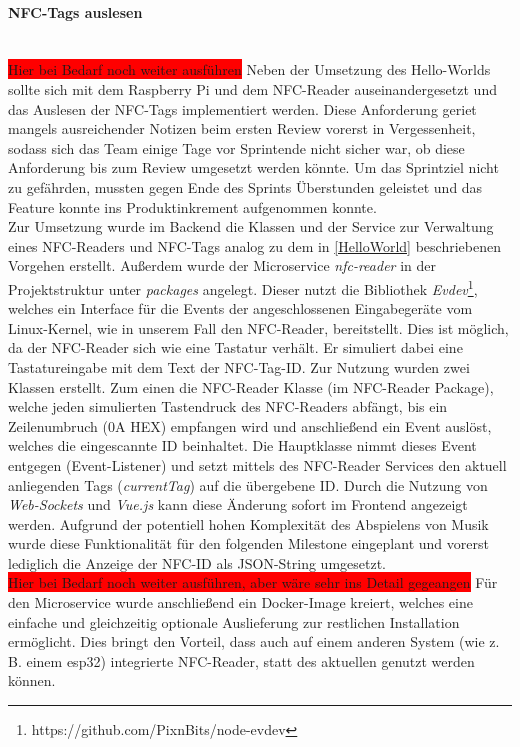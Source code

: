 \documentclass[10pt, a4paper]{article}
\begin{document}
\begin{onehalfspace}
\paragraph*{NFC-Tags auslesen} $~$ \\
\colorbox{red}{Hier bei Bedarf noch weiter ausführen}
Neben der Umsetzung des Hello-Worlds sollte sich mit dem Raspberry Pi und dem NFC-Reader auseinandergesetzt und das Auslesen der NFC-Tags implementiert werden. Diese Anforderung geriet mangels ausreichender Notizen beim ersten Review vorerst
in Vergessenheit, sodass sich das Team einige Tage vor Sprintende nicht sicher war, ob diese Anforderung bis zum Review umgesetzt werden könnte.
Um das Sprintziel nicht zu gefährden, mussten gegen Ende des Sprints Überstunden geleistet und das Feature konnte ins Produktinkrement aufgenommen konnte.
\\
Zur Umsetzung wurde im Backend die Klassen und der Service zur Verwaltung eines NFC-Readers und NFC-Tags
analog zu dem in \ref{HelloWorld} beschriebenen Vorgehen erstellt.
Außerdem wurde der Microservice \textit{nfc-reader} in der Projektstruktur unter \textit{packages}
angelegt. Dieser nutzt die Bibliothek \textit{Evdev}\footnote{https://github.com/PixnBits/node-evdev}, welches ein Interface für die Events der angeschlossenen
Eingabegeräte vom Linux-Kernel, wie in unserem Fall den NFC-Reader, bereitstellt. Dies ist möglich, da der NFC-Reader sich wie eine Tastatur verhält. Er
simuliert dabei eine Tastatureingabe mit dem Text der NFC-Tag-ID. Zur Nutzung wurden zwei Klassen erstellt. Zum einen die NFC-Reader Klasse
(im NFC-Reader Package), welche jeden simulierten Tastendruck des NFC-Readers abfängt, bis ein Zeilenumbruch (0A HEX) empfangen
wird und anschließend ein Event auslöst, welches die eingescannte ID beinhaltet. Die Hauptklasse nimmt dieses Event entgegen (Event-Listener) und setzt mittels des
NFC-Reader Services den aktuell anliegenden Tags (\textit{currentTag}) auf die übergebene ID. Durch die Nutzung von \textit{Web-Sockets} und \textit{Vue.js}
kann diese Änderung sofort im Frontend angezeigt werden. Aufgrund der potentiell hohen Komplexität des Abspielens von Musik wurde diese Funktionalität für den
folgenden Milestone eingeplant und vorerst lediglich die Anzeige der NFC-ID als JSON-String umgesetzt.
\\
\colorbox{red}{Hier bei Bedarf noch weiter ausführen, aber wäre sehr ins Detail gegeangen}
Für den Microservice wurde anschließend ein Docker-Image kreiert, welches eine einfache und gleichzeitig optionale Auslieferung zur restlichen Installation
ermöglicht. Dies bringt den Vorteil, dass auch auf einem anderen System (wie z. B. einem esp32) integrierte NFC-Reader, statt des aktuellen genutzt werden können.


\end{onehalfspace}
\end{document}
